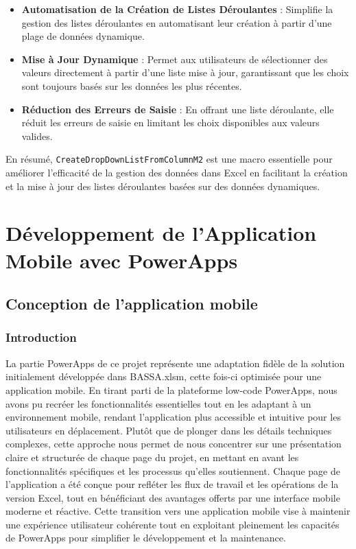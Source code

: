 \documentclass[a4paper, oneside, 12pt, final]{extreport}
\begin{document}
\begin{itemize}
    \item \textbf{Automatisation de la Création de Listes Déroulantes} : Simplifie la gestion des listes déroulantes en automatisant leur création à partir d'une plage de données dynamique.
    \item \textbf{Mise à Jour Dynamique} : Permet aux utilisateurs de sélectionner des valeurs directement à partir d'une liste mise à jour, garantissant que les choix sont toujours basés sur les données les plus récentes.
    \item \textbf{Réduction des Erreurs de Saisie} : En offrant une liste déroulante, elle réduit les erreurs de saisie en limitant les choix disponibles aux valeurs valides.
\end{itemize}

En résumé, \texttt{CreateDropDownListFromColumnM2} est une macro essentielle pour améliorer l'efficacité de la gestion des données dans Excel en facilitant la création et la mise à jour des listes déroulantes basées sur des données dynamiques.
\part{Développement de l'Application Mobile avec PowerApps  }
\chapter{Conception de l'application mobile}
\section{Introduction}
La partie PowerApps de ce projet représente une adaptation fidèle de la solution initialement développée dans BASSA.xlsm, cette fois-ci optimisée pour une application mobile. En tirant parti de la plateforme low-code PowerApps, nous avons pu recréer les fonctionnalités essentielles tout en les adaptant à un environnement mobile, rendant l'application plus accessible et intuitive pour les utilisateurs en déplacement. Plutôt que de plonger dans les détails techniques complexes, cette approche nous permet de nous concentrer sur une présentation claire et structurée de chaque page du projet, en mettant en avant les fonctionnalités spécifiques et les processus qu'elles soutiennent. Chaque page de l'application a été conçue pour refléter les flux de travail et les opérations de la version Excel, tout en bénéficiant des avantages offerts par une interface mobile moderne et réactive. Cette transition vers une application mobile vise à maintenir une expérience utilisateur cohérente tout en exploitant pleinement les capacités de PowerApps pour simplifier le développement et la maintenance.
\newpage
\end{document}
